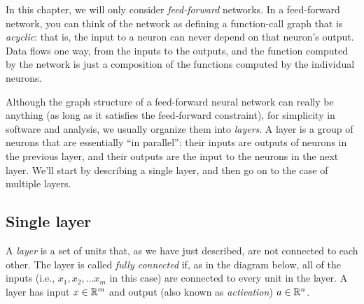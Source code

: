 In this chapter, we will only consider {\it feed-forward} networks.  In
a feed-forward network, you can think of the network as defining a
function-call graph that is {\em acyclic}:  that is, the input to a
neuron can never depend on that neuron's output.  Data flows one way,
from the inputs to the outputs, and the function computed by the
network is just a composition of the functions computed by the
individual neurons.

Although the graph structure of a feed-forward neural network can really be
anything (as long as it satisfies the feed-forward constraint), for
simplicity in software and analysis, we usually organize them into
  {\em layers}.   A layer is a group of neurons that are essentially
``in parallel'':  their inputs are outputs of neurons in the previous
layer, and their outputs are the input to the neurons in the next
layer.   We'll start by describing a single layer, and then go on to
the case of multiple layers.

\subsection{Single layer}
A {\em layer} is a set of units that, as we have just described, are
not connected to each other. The layer is called
  {\em fully connected} if, as in the diagram below, 
  all of the inputs
(i.e., $x_1, x_2, \ldots x_m$ in this
case) are connected to every unit in the layer.  A layer has input $x \in \mathbb{R}^m$ and output (also known as
  {\em activation}) $a \in \mathbb{R}^n$.

